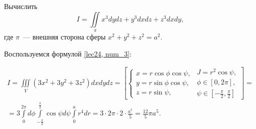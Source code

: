\documentclass[../../main.tex]{subfiles}
\begin{document}
\begin{example}
	Вычислить \[I = \iint\limits_\pi x^3dydz + y^3dxdz + z^3dxdy,\] где $\pi$~---
	внешняя сторона сферы $x^2 + y^2 + z^2 = a^2.$
	 
	Воспользуемся формулой \eqref{lec24, num_3}:
	
	\begin{multline*}I=\iiint\limits_V (3x^2 + 3y^2 + 3z^2)dxdydz = \left[ 
	\begin{cases}x=
	 r\cos\phi \cos\psi,\\ y=r\sin\phi\cos\psi, \\ z=r\sin\psi,\end{cases}
	\begin{gathered}J =r^2\cos\psi,\\ \phi\in[0, 2\pi], \\ 
	\textstyle\psi\in\left[-\frac{\pi}{2},
	  \frac{\pi}{2}\right]\end{gathered}\right]=\\ 
	  =3\int\limits_0^{2\pi}d\phi\int\limits
	  _{-\frac{\pi}{2}}^{\frac{\pi}{2}}\cos\psi d\psi\int\limits_0^a r^4 dr=
	  3\cdot2\pi\cdot2\cdot\frac{a^5}5 = 
	  \frac{12}{5}\pi a^5.\end{multline*}
\end{example}
\end{document}
